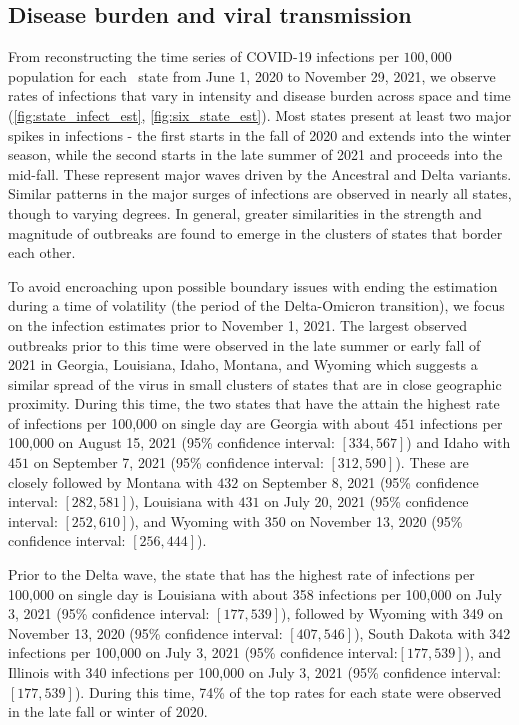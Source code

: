 \documentclass{article}
\begin{document}
\subsection{Disease burden and viral transmission}

From reconstructing the time series of COVID-19 infections per $100,000$
population for each \US\ state from June 1, 2020 to November 29, 2021, we observe
rates of infections that vary in intensity and disease burden across space and
time (\autoref{fig:state_infect_est},
 \autoref{fig:six_state_est}).  
 Most states present at least two major spikes in infections - the first starts in the fall of 2020 
 and extends into the winter season, while 
 the second starts in the late summer of 2021 and proceeds into the mid-fall. These represent major 
 waves driven by the Ancestral and Delta variants.
Similar patterns in the major surges of infections are observed in nearly all states, though to varying
 degrees. In general, greater similarities
in the strength and magnitude of outbreaks are found to emerge in the clusters of
states that border each other.

To avoid encroaching upon possible boundary issues with ending the estimation during a time of volatility
 (the period of the Delta-Omicron transition), 
we focus on the infection estimates prior to November 1, 2021.
The largest observed outbreaks prior to this time were observed in the late summer or early fall of 2021
in Georgia, Louisiana, Idaho, Montana, and Wyoming which suggests a similar spread of the virus in
small clusters of states that are in close geographic proximity. During this time, the two states that
have the attain the highest rate of infections per 100,000 on single day are Georgia with
about $451$ infections per 100,000 on August 15, 2021 (95\% confidence interval:
$[334, 567]$) and Idaho with $451$ on September 7, 2021 (95\%
confidence interval: $[312, 590]$). These are closely followed by Montana with $432$ on 
September 8, 2021 (95\% confidence interval: $[282, 581]$), Louisiana with $431$ on July 20, 2021
(95\% confidence interval: $[252, 610]$), and Wyoming with $350$ on November 13, 2020
(95\% confidence interval: $[256, 444]$).

Prior to the Delta wave, the state that has the
highest rate of infections per 100,000 on single day is Louisiana with about
358 infections per 100,000 on July 3, 2021 (95\% confidence interval:
$[177, 539]$), followed by Wyoming with 349 on November 13, 2020 (95\%
confidence interval: $[407, 546]$), South Dakota with 342 infections per 100,000 on July 3, 2021 
(95\% confidence interval:$[177, 539]$), and Illinois with 340 infections per
 100,000 on July 3, 2021 (95\% confidence interval:
$[177, 539]$). During this time, 74\% of the top rates for each state were observed in the
 late fall or winter of 2020.
\end{document}
